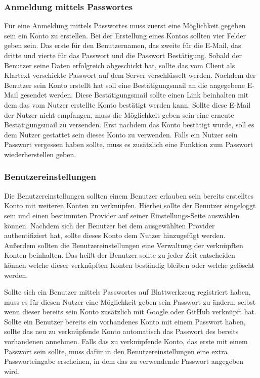 \documentclass[11pt]{article}
\begin{document}
	\subsubsection{Anmeldung mittels Passwortes}
	Für eine Anmeldung mittels Passwortes muss zuerst eine Möglichkeit gegeben sein ein Konto zu erstellen. Bei der Erstellung eines Kontos sollten vier Felder geben sein. Das erste für den Benutzernamen, das zweite für die E-Mail, das dritte und vierte für das Passwort und die Passwort Bestätigung. Sobald der Benutzer seine Daten erfolgreich abgeschickt hat, sollte das vom Client als Klartext verschickte Passwort auf dem Server verschlüsselt werden. Nachdem der Benutzer sein Konto erstellt hat soll eine Bestätigungsmail an die angegebene E-Mail gesendet werden. Diese Bestätigungsmail sollte einen Link beinhalten mit dem das vom Nutzer erstellte Konto bestätigt werden kann. Sollte diese E-Mail der Nutzer nicht empfangen, muss die Möglichkeit geben sein eine erneute Bestätigungsmail zu versenden. Erst nachdem das Konto bestätigt wurde, soll es dem Nutzer gestattet sein dieses Konto zu verwenden. Falls ein Nutzer sein Passwort vergessen haben sollte, muss es zusätzlich eine Funktion zum Passwort wiederherstellen geben.
	
	\subsubsection{Benutzereinstellungen}
	Die Benutzereinstellungen sollten einem Benutzer erlauben sein bereits erstelltes Konto mit weiteren Konten zu verknüpfen. Hierbei sollte der Benutzer eingeloggt sein und einen bestimmten Provider auf seiner Einstellungs-Seite auswählen können. Nachdem sich der Benutzer bei dem ausgewählten Provider authentifiziert hat, sollte dieses Konto dem Nutzer hinzugefügt werden.  Außerdem sollten die Benutzereinstellungen eine Verwaltung der verknüpften Konten beinhalten. Das heißt der Benutzer sollte zu jeder Zeit entscheiden können welche dieser verknüpften Konten beständig bleiben oder welche gelöscht werden.
	
	Sollte sich ein Benutzer mittels Passwortes auf Blattwerkzeug registriert haben, muss es für diesen Nutzer eine Möglichkeit geben sein Passwort zu ändern, selbst wenn dieser bereits sein Konto zusätzlich mit Google oder GitHub verknüpft hat. Sollte ein Benutzer bereits ein vorhandenes Konto mit einem Passwort haben, sollte das neu zu verknüpfende Konto automatisch das Passwort des bereits vorhandenen annehmen. Falls das zu verknüpfende Konto, das erste mit einem Passwort sein sollte, muss dafür in den Benutzereinstellungen eine extra Passworteingabe erscheinen, in dem das zu verwendende Passwort angegeben wird.
	
\end{document}
